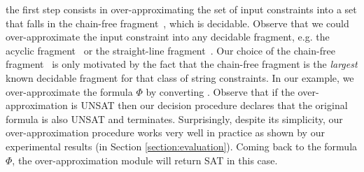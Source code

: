 \documentclass[sigplan,screen]{acmart}
\begin{document}
 the first step consists in over-approximating the set of input constraints into a set that falls in the chain-free fragment~\cite{abdulla2019chain}, which is decidable. Observe that we could  over-approximate the input constraint into any decidable fragment, e.g. the acyclic fragment~\cite{abdulla2014string} or the straight-line fragment~\cite{chen2019decision}. Our choice of the chain-free fragment~\cite{abdulla2019chain} is only motivated by the fact that the chain-free fragment is the {\em largest} known decidable fragment for that class of string constraints. In our example, we over-approximate the formula $\Phi$ by converting . 
Observe that if the over-approximation is UNSAT then our decision procedure  declares that the original formula is also UNSAT and terminates. Surprisingly, despite its simplicity, our over-approximation procedure works very well in practice as shown by our experimental results  (in Section \ref{section:evaluation}). Coming back to the formula $\Phi$, the over-approximation module will  return SAT  in this case. 
\end{document}
